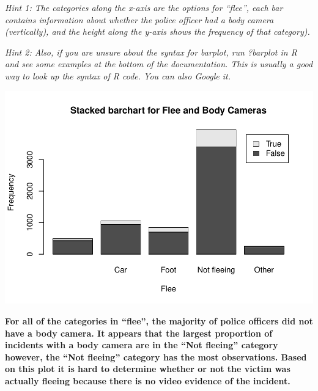 \documentclass[
]{article}
\newenvironment{Shaded}{\begin{snugshade}}{\end{snugshade}}
\newcommand{\AttributeTok}[1]{\textcolor[rgb]{0.77,0.63,0.00}{#1}}
\newcommand{\FunctionTok}[1]{\textcolor[rgb]{0.00,0.00,0.00}{#1}}
\newcommand{\NormalTok}[1]{#1}
\newcommand{\OtherTok}[1]{\textcolor[rgb]{0.56,0.35,0.01}{#1}}
\newcommand{\SpecialCharTok}[1]{\textcolor[rgb]{0.00,0.00,0.00}{#1}}
\newcommand{\StringTok}[1]{\textcolor[rgb]{0.31,0.60,0.02}{#1}}
\begin{document}
\emph{Hint 1: The categories along the x-axis are the options for
``flee'', each bar contains information about whether the police officer
had a body camera (vertically), and the height along the y-axis shows
the frequency of that category).}

\emph{Hint 2: Also, if you are unsure about the syntax for barplot, run
?barplot in R and see some examples at the bottom of the documentation.
This is usually a good way to look up the syntax of R code. You can also
Google it.}

\begin{Shaded}
\end{Shaded}

\includegraphics{Assignments_files/figure-latex/unnamed-chunk-26-1.pdf}

\textbf{For all of the categories in ``flee'', the majority of police
officers did not have a body camera. It appears that the largest
proportion of incidents with a body camera are in the ``Not fleeing''
category however, the ``Not fleeing'' category has the most
observations. Based on this plot it is hard to determine whether or not
the victim was actually fleeing because there is no video evidence of
the incident.}
\end{document}
